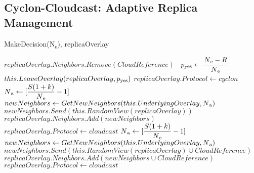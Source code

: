 \documentclass[runningheads]{llncs}
\begin{document}
\subsection{Cyclon-Cloudcast: Adaptive Replica Management}

\begin{algorithm}[t]
\caption{MakeDecision(N\textsubscript{e}), replicaOverlay}
\label{alg:makedecision}
\begin{algorithmic}
        \State $replicaOverlay.Neighbors.Remove(CloudReference)$\
            \State $p\textsubscript{yes} \gets \dfrac{N\textsubscript{e} - R}{N\textsubscript{e}}$
            \State $this.LeaveOverlay(replicaOverlay, p\textsubscript{yes})$
        \State $replicaOverlay.Protocol \gets cyclon$
        \EndIf
        \State $N\textsubscript{a} \gets [\dfrac{S(1 + k)}{N\textsubscript{e}} - 1]$
        \State $newNeighbors \gets GetNewNeighbors(this.UnderlyingOverlay, N\textsubscript{a})$
        \State $newNeighbors.Send(this.RandomView(replicaOverlay))$
        \State $replicaOverlay.Neighbors.Add(newNeighbors)$
        \State $replicaOverlay.Protocol \gets cloudcast$
        \State $N\textsubscript{a} \gets [\dfrac{S(1 + k)}{N\textsubscript{e}} - 1]$
        \State $newNeighbors \gets GetNewNeighbors(this.UnderlyingOverlay, N\textsubscript{a})$
        \State $newNeighbors.Send(this.RandomView(replicaOverlay) \cup CloudReference)$
        \State $replicaOverlay.Neighbors.Add(newNeighbors \cup CloudReference)$
        \State $replicaOverlay.Protocol \gets cloudcast$
    \EndIf
\end{algorithmic}
\end{algorithm}
\end{document}

